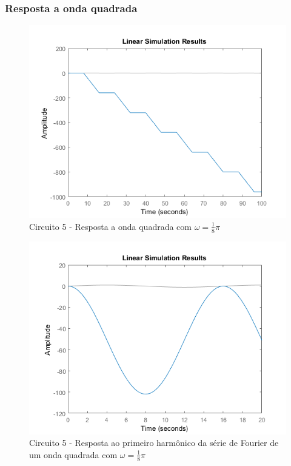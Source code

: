 \documentclass[a4paper, 12pt]{article}
\begin{document}
			\subsubsection{Resposta a onda quadrada}
			\begin{figure}[!ht]
				\centering
				\includegraphics[scale=0.71]{img/1i_circ5.png}
				\caption{Circuito 5 - Resposta a onda quadrada com $\omega = \frac{1}{8}\pi$}
			\end{figure}
			\begin{figure}[!ht]
				\centering
				\includegraphics[scale=0.71]{img/1j_circ5.png}
				\caption{Circuito 5 - Resposta ao primeiro harmônico da série de Fourier de um onda quadrada com $\omega = \frac{1}{8}\pi$}
			\end{figure}
\end{document}

